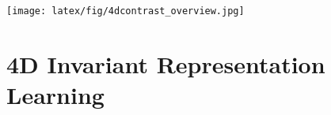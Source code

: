 \documentclass[runningheads]{llncs}
\newcommand{\OURS}{4DContrast}
\begin{document}
\begin{comment}
\paragraph{Representation Learning in 2D}
Representation learning is well-studied in 2D computer vision, where most of the pretext tasks are integrated via a contrastive learning framework. The basic idea of contrastive learning \cite{hadsell2006dimensionality} is to make positive pairs close to each other and negative pairs to move away from each other using Siamese networks \cite{chen2020simple,he2020momentum,chen2020improved}.
But these contrastive methods rely on a large number of negative samples which can be from the same training batch \cite{chen2020simple} or a memory bank \cite{wu2018unsupervised}. MoCo \cite{he2020momentum} builds a dynamic dictionary with a queue of negative samples and a momentum encoder to facilitate contrastive learning. SiaSiam \cite{chen2021exploring} proposes a simple Siamese representation architecture for 2D images that get rid of negative sample pairs, large batches, and momentum encoder. In this work, we adopt SimSiam as the contrastive learning framework and explore contrastive learning from a sequence of generated 3D scenes.
\end{comment} 
\begin{figure*}[t]
  \centering
   \texttt{[image: latex/fig/4dcontrast\_overview.jpg]}
   \vspace{-0.3cm}
   \caption{Method overview. 
   \OURS{} learns effective 3D feature representations imbued with 4D signal from moving object sequences.
   During pre-training, we augment static 3D scene data with a moving object from a synthetic shape dataset.
   We can then establish dynamic correspondences between the spatio-temporal features learned from the 4D sequence with 3D features of individual static frames.
   We employ contrastive learning under not only 3D geometric correspondence between individual frames, but also with their corresponding 4D counterpart, as well as 4D-4D constraints to anchor the 4D feature learning.
   This enables 4D-invariant representation learning, which we can apply to various downstream 3D scene understanding tasks.
   }
   \label{fig:method}
   \vspace{-5mm}
\end{figure*}

\section{4D Invariant Representation Learning}
\end{document}
